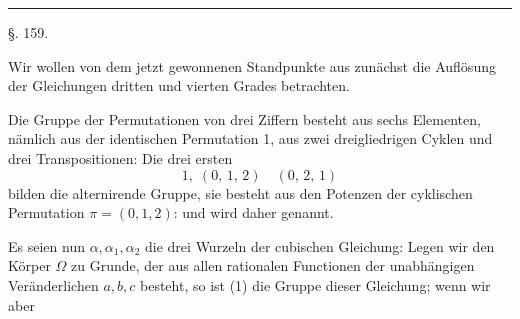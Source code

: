 \begin{center}


\rule{3cm}{0.4pt}

\S. 159.

\end{center}

Wir wollen von dem jetzt gewonnenen Standpunkte aus zun\"achst die
Aufl\"osung der Gleichungen dritten und vierten Grades
betrachten.

Die Gruppe der Permutationen von drei Ziffern besteht aus
sechs Elementen, n\"amlich aus der identischen Permutation 1, aus
zwei dreigliedrigen Cyklen und drei Transpositionen:
Die drei ersten
\[
1, \; (0,\,1,\,2) \quad (0,\,2,\,1)
\]
bilden die alternirende Gruppe, sie besteht aus den Potenzen der
cyklischen Permutation $\pi = (0, 1, 2)$:
und wird daher  genannt.

Es seien nun $\alpha, \alpha_1, \alpha_2$ die drei Wurzeln der cubischen
Gleichung:
Legen wir den K\"orper $\Omega$ zu Grunde, der aus allen rationalen
 Functionen der unabh\"angigen Ver\"anderlichen $a, b, c$ besteht,
so ist (1) die Gruppe dieser Gleichung; wenn wir aber
